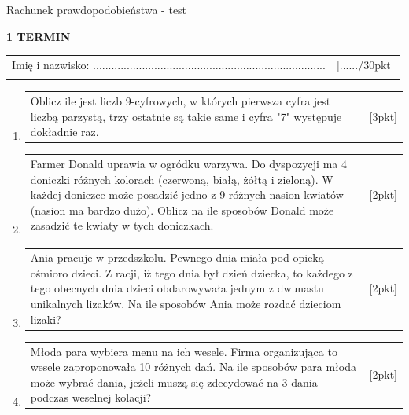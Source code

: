 \documentclass[12pt,a4paper]{article}
\begin{document}
	\begin{center}
		\LARGE Rachunek prawdopodobieństwa - test
	\end{center}
	\vspace{1.5cm}
	\begin{flushright}
		\textbf{1 TERMIN}
	\end{flushright}
	\begin{tabular}{p{13cm} r}
		Imię i nazwisko: ............................................................................
		&[....../30pkt]\\ 
		\vspace{0.5cm}
	\end{tabular}
	\begin{enumerate}[1.]
		\item  \begin{tabular}{p{13cm} r}
			Oblicz ile jest liczb 9-cyfrowych, w których pierwsza cyfra jest liczbą parzystą, trzy ostatnie są takie same i cyfra "7" występuje dokładnie raz. &[3pkt]\\ 
		\end{tabular}
		
		\item  \begin{tabular}{p{13cm} r}
			Farmer Donald uprawia w ogródku warzywa. Do dyspozycji ma 4 doniczki różnych kolorach (czerwoną, białą, żółtą i zieloną). W każdej doniczce może posadzić jedno z 9 różnych nasion kwiatów (nasion ma bardzo dużo). Oblicz na ile sposobów Donald może zasadzić te kwiaty w tych doniczkach.  &[2pkt]\\ 
		\end{tabular}
	
		\item  \begin{tabular}{p{13cm} r}
			Ania pracuje w przedszkolu. Pewnego dnia miała pod opieką ośmioro dzieci. Z racji, iż tego dnia był dzień dziecka, to każdego z tego obecnych dnia dzieci obdarowywała jednym z dwunastu unikalnych lizaków. Na ile sposobów Ania może rozdać dzieciom lizaki?  &[2pkt]\\ 
		\end{tabular}
	
		\item \begin{tabular}{p{13cm} r}
			Młoda para wybiera menu na ich wesele. Firma organizująca to wesele zaproponowała 10 różnych dań. Na ile sposobów para młoda może wybrać dania, jeżeli muszą się zdecydować na 3 dania podczas weselnej kolacji?	  &[2pkt]\\ 
		\end{tabular}
	

\end{enumerate}
\end{document}
